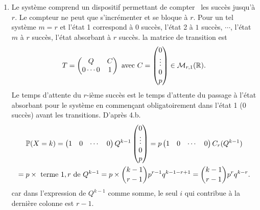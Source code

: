 \begin{enumerate}
\begin{enumerate}
    \item Le système comprend un dispositif permettant de \og compter\fg~ les succès jusqu'à $r$. Le compteur ne peut que s'incrémenter et se bloque à $r$. Pour un tel système $m=r$ et l'état 1 correspond à 0 succès, l'état 2 à $1$ succès, $\cdots$, l'état $m$ à $r$ succès, l'état absorbant à $r$ succès. la matrice de transition est 
\[
  T 
=
\begin{pmatrix}
  Q          & C \\
  0 \cdots 0 & 1
\end{pmatrix}
\text{ avec }
C=
\begin{pmatrix}
  0 \\ \vdots \\0 \\ p
\end{pmatrix}
\in \mathcal{M}_{r,1}(\mathbb{R}).
\]
Le temps d'attente du $r$-ième succès est le temps d'attente du passage à l'état absorbant pour le système en commençant obligatoirement dans l'état 1 (0 succès) avant les transitions. D'après 4.b.
\begin{multline*}
  \mathbb{P}(X=k)
  =
\begin{pmatrix}
  1 & 0 & \cdots & 0
\end{pmatrix}
Q^{k-1}
\begin{pmatrix}
  0 \\ \vdots \\0 \\ p
\end{pmatrix}
=
p
\begin{pmatrix}
  1 & 0 & \cdots & 0
\end{pmatrix}
C_r(Q^{k-1}) \\
= p \times \text{ terme $1, r$ de } Q^{k-1}
= p \times \binom{k-1}{r-1}p^{r-1}q^{k-1 - r +1}
= \binom{k-1}{r-1}p^{r}q^{k - r}.
\end{multline*}
car dans l'expression de $Q^{k-1}$ comme somme, le seul $i$ qui contribue à la dernière colonne est $r-1$.
  \end{enumerate}

\end{enumerate}
